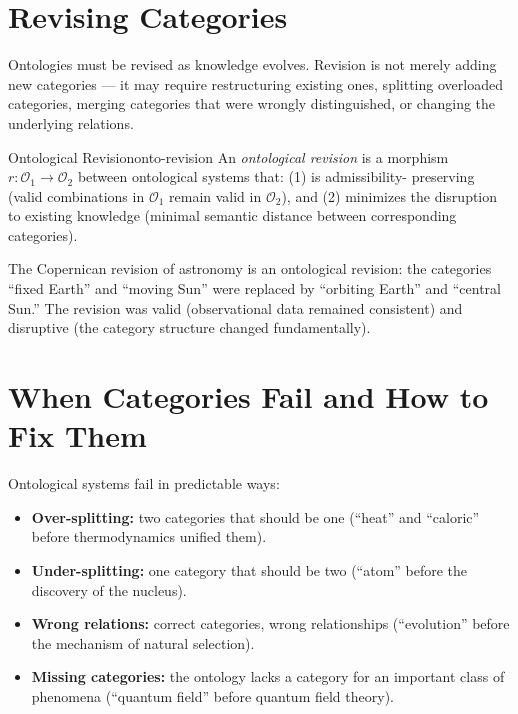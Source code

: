 \section{Revising Categories}

Ontologies must be revised as knowledge evolves. Revision is not merely
adding new categories — it may require restructuring existing ones,
splitting overloaded categories, merging categories that were wrongly
distinguished, or changing the underlying relations.

\begin{definition}{Ontological Revision}{onto-revision}
  An \emph{ontological revision} is a morphism $r : \mathcal{O}_1 \to
  \mathcal{O}_2$ between ontological systems that: (1) is admissibility-
  preserving (valid combinations in $\mathcal{O}_1$ remain valid in
  $\mathcal{O}_2$), and (2) minimizes the disruption to existing
  knowledge (minimal semantic distance between corresponding categories).
\end{definition}

The Copernican revision of astronomy is an ontological revision:
the categories ``fixed Earth'' and ``moving Sun'' were replaced by
``orbiting Earth'' and ``central Sun.'' The revision was valid
(observational data remained consistent) and disruptive (the category
structure changed fundamentally).

\section{When Categories Fail and How to Fix Them}

Ontological systems fail in predictable ways:

\begin{itemize}
  \item \textbf{Over-splitting:} two categories that should be one
        (``heat'' and ``caloric'' before thermodynamics unified them).
  \item \textbf{Under-splitting:} one category that should be two
        (``atom'' before the discovery of the nucleus).
  \item \textbf{Wrong relations:} correct categories, wrong relationships
        (``evolution'' before the mechanism of natural selection).
  \item \textbf{Missing categories:} the ontology lacks a category for
        an important class of phenomena (``quantum field'' before
        quantum field theory).
\end{itemize}

